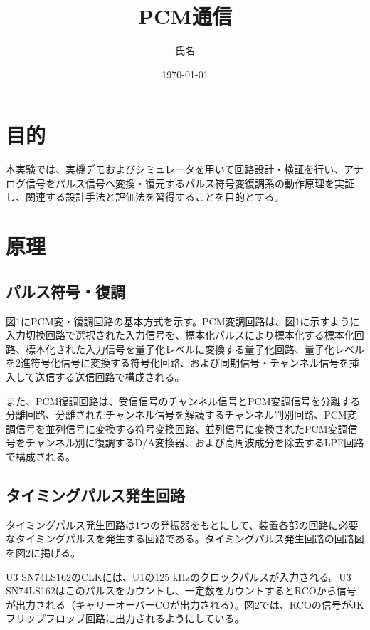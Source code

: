 \documentclass[
  a4paper,
  11pt,
]{ltjsarticle}
\title{PCM通信}
\author{氏名}
\date{\today}
\begin{document}
\maketitle
\tableofcontents
\clearpage

\section{目的}
本実験では、実機デモおよびシミュレータを用いて回路設計・検証を行い、アナログ信号をパルス信号へ変換・復元するパルス符号変復調系の動作原理を実証し、関連する設計手法と評価法を習得することを目的とする。

\section{原理}

\subsection{パルス符号・復調}
図1にPCM変・復調回路の基本方式を示す。PCM変調回路は、図1に示すように入力切換回路で選択された入力信号を、標本化パルスにより標本化する標本化回路、標本化された入力信号を量子化レベルに変換する量子化回路、量子化レベルを2進符号化信号に変換する符号化回路、および同期信号・チャンネル信号を挿入して送信する送信回路で構成される。

また、PCM復調回路は、受信信号のチャンネル信号とPCM変調信号を分離する分離回路、分離されたチャンネル信号を解読するチャンネル判別回路、PCM変調信号を並列信号に変換する符号変換回路、並列信号に変換されたPCM変調信号をチャンネル別に復調するD/A変換器、および高周波成分を除去するLPF回路で構成される。

\subsection{タイミングパルス発生回路}
タイミングパルス発生回路は1つの発振器をもとにして、装置各部の回路に必要なタイミングパルスを発生する回路である。タイミングパルス発生回路の回路図を図2に掲げる。

U3 SN74LS162のCLKには、U1の125 \si{\kilo\hertz}のクロックパルスが入力される。U3 SN74LS162はこのパルスをカウントし、一定数をカウントするとRCOから信号が出力される（キャリーオーバーCOが出力される）。図2では、RCOの信号がJKフリップフロップ回路に出力されるようにしている。
\end{document}
